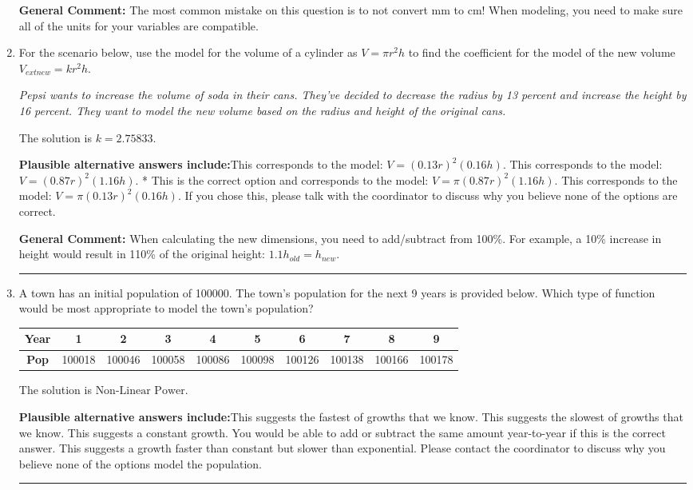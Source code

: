 \documentclass{extbook}[14pt]
\newcommand{\litem}[1]{\item #1

\rule{\textwidth}{0.4pt}}
\begin{document}
\begin{enumerate}
{\textbf{General Comment:} The most common mistake on this question is to not convert mm to cm! When modeling, you need to make sure all of the units for your variables are compatible.
}
\litem{
For the scenario below, use the model for the volume of a cylinder as $V = \pi r^2 h$ to find the coefficient for the model of the new volume $V_{	ext{new}} = k r^2 h$.

\begin{center}
    \textit{ Pepsi wants to increase the volume of soda in their cans. They've decided to decrease the radius by 13 percent and increase the height by 16 percent. They want to model the new volume based on the radius and height of the original cans. }
\end{center}
The solution is \( k = 2.75833 \).\begin{enumerate}[label=\Alph*.]
\textbf{Plausible alternative answers include:}This corresponds to the model: $V = (0.13 r)^2 (0.16 h)$.
This corresponds to the model: $V = (0.87 r)^2 (1.16 h)$.
* This is the correct option and corresponds to the model: $V = \pi (0.87 r)^2 (1.16 h)$.
This corresponds to the model: $V = \pi (0.13 r)^2 (0.16 h)$.
If you chose this, please talk with the coordinator to discuss why you believe none of the options are correct.
\end{enumerate}

\textbf{General Comment:} When calculating the new dimensions, you need to add/subtract from 100\%. For example, a 10\% increase in height would result in 110\% of the original height: $1.1h_{old} = h_{new}$.
}
\litem{
A town has an initial population of 100000. The town's population for the next 9 years is provided below. Which type of function would be most appropriate to model the town's population?


\begin{tabular}{c|c|c|c|c|c|c|c|c|c}
\textbf{Year} &1 &2 &3 &4 &5 &6 &7 &8 &9\tabularnewline \hline
\textbf{Pop} &100018 &100046 &100058 &100086 &100098 &100126 &100138 &100166 &100178\end{tabular}The solution is \( \text{Non-Linear Power} \).\begin{enumerate}[label=\Alph*.]
\textbf{Plausible alternative answers include:}This suggests the fastest of growths that we know.
This suggests the slowest of growths that we know.
This suggests a constant growth. You would be able to add or subtract the same amount year-to-year if this is the correct answer.
This suggests a growth faster than constant but slower than exponential.
Please contact the coordinator to discuss why you believe none of the options model the population.
\end{enumerate}

}
\end{enumerate}
\end{document}
